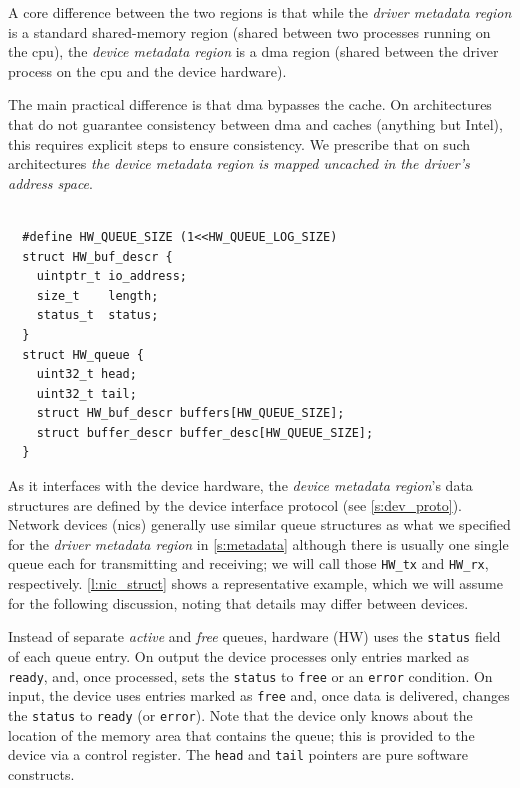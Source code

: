 \documentclass[a4paper,12pt]{report}
\newcommand{\code}[1]{\texttt{#1}}
\newcommand{\Obj}[1]{\textsl{#1}}
\begin{document}
A core difference between the two regions is that while the
\Obj{driver metadata
region} is a standard shared-memory region (shared between two
processes running on the \gls{cpu}), the \Obj{device metadata region} is a \gls{dma}
region (shared between the driver process on the \gls{cpu} and the device
hardware).

The main practical difference is that \gls{dma} bypasses the cache.  On
architectures that do not guarantee consistency between \gls{dma} and caches
(anything but Intel), this requires explicit steps to ensure
consistency. We prescribe that on such architectures \emph{the device metadata
region is mapped uncached in the driver's address space}.

\begin{lstlisting}[gobble=2,
  firstline=2,float=ht,tabsize=2,
  label={l:nic_struct},
  caption={Typical network device queue data structures.}]

  #define HW_QUEUE_SIZE (1<<HW_QUEUE_LOG_SIZE)
  struct HW_buf_descr {
    uintptr_t io_address;
    size_t    length;
    status_t  status;
  }
  struct HW_queue {
    uint32_t head;
    uint32_t tail;
    struct HW_buf_descr buffers[HW_QUEUE_SIZE];
    struct buffer_descr buffer_desc[HW_QUEUE_SIZE];
  }
\end{lstlisting}

As it interfaces with the device hardware, the \Obj{device metadata region}'s data
structures are defined by the device interface protocol (see
\autoref{s:dev_proto}). Network devices (\glspl{nic}) generally
use similar queue structures as what we specified for the \emph{driver
metadata region} in \autoref{s:metadata}
although there is usually one single queue each for transmitting and
receiving; we will call those \code{HW\_\gls{tx}} and \code{HW\_\gls{rx}},
respectively. \autoref{l:nic_struct} shows a representative example,
which we will assume for the following discussion, noting that details
may differ between devices.

Instead of separate \emph{active} and \emph{free} queues, hardware
(HW) uses the \code{status} field of each
queue entry. On output the device processes only entries marked
as \code{ready}, and, once processed, sets the \code{status} to \code{free}
or an \code{error} condition. On input, the device uses entries marked
as \code{free} and, once data is delivered, changes the \code{status} to
\code{ready} (or \code{error}). Note that the device only knows about
the location of the memory area that contains the queue; this is provided to the device via a control
register. The \code{head} and \code{tail} pointers are pure software
constructs.
\end{document}
